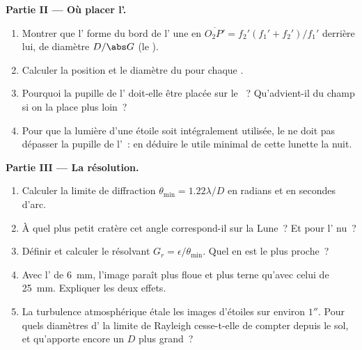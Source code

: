 \begin{problem}
\medskip
\noindent\textbf{Partie II --- Où placer l'.}
\begin{enumerate}[resume]
  \item Montrer que l' forme du bord de l' une  en $\overline{O_2P'} = f_2'(f_1' + f_2')/f_1'$ derrière
        lui, de diamètre $D/\abs G$ (le ).
  \item Calculer la position et le diamètre du  pour
        chaque .
  \item Pourquoi la pupille de l' doit-elle être placée sur le ~? Qu'advient-il du champ si on la place plus loin~?
  \item Pour que la lumière d'une étoile soit intégralement utilisée, le
         ne doit pas dépasser la pupille de l'~: en
        déduire le  utile minimal de cette lunette la nuit.
\end{enumerate}

\medskip
\noindent\textbf{Partie III --- La résolution.}
\begin{enumerate}[resume]
  \item Calculer la limite de diffraction $\theta_{\min} = 1.22\lambda/D$
        en radians et en secondes d'arc.
  \item À quel plus petit cratère cet angle correspond-il sur la Lune~?
        Et pour l' nu~?
  \item Définir et calculer le  résolvant $G_r =
        \epsilon/\theta_{\min}$. Quel  en est le plus proche~?
  \item Avec l' de \qty{6}{mm}, l'image paraît plus floue et
        plus terne qu'avec celui de \qty{25}{mm}. Expliquer les deux
        effets.
  \item La turbulence atmosphérique étale les images d'étoiles sur
        environ $1''$. Pour quels diamètres d' la limite de
        Rayleigh cesse-t-elle de compter depuis le sol, et qu'apporte
        encore un $D$ plus grand~?
\end{enumerate}


\end{problem}
